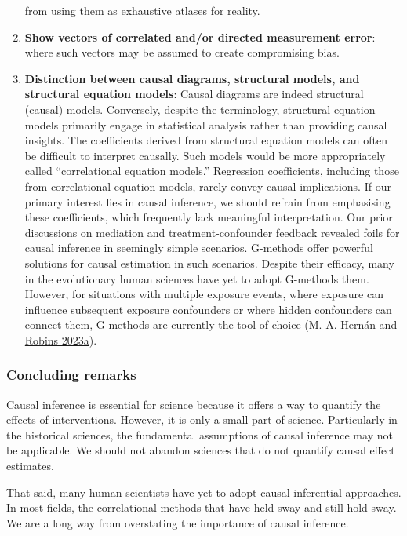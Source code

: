 \documentclass[
  singlecolumn]{article}
\begin{document}
\begin{enumerate}
  from using them as exhaustive atlases for reality.
\item
  \textbf{Show vectors of correlated and/or directed measurement error}:
  where such vectors may be assumed to create compromising bias.
\item
  \textbf{Distinction between causal diagrams, structural models, and
  structural equation models}: Causal diagrams are indeed structural
  (causal) models. Conversely, despite the terminology, structural
  equation models primarily engage in statistical analysis rather than
  providing causal insights. The coefficients derived from structural
  equation models can often be difficult to interpret causally. Such
  models would be more appropriately called ``correlational equation
  models.'' Regression coefficients, including those from correlational
  equation models, rarely convey causal implications. If our primary
  interest lies in causal inference, we should refrain from emphasising
  these coefficients, which frequently lack meaningful interpretation.
  Our prior discussions on mediation and treatment-confounder feedback
  revealed foils for causal inference in seemingly simple scenarios.
  G-methods offer powerful solutions for causal estimation in such
  scenarios. Despite their efficacy, many in the evolutionary human
  sciences have yet to adopt G-methods them. However, for situations
  with multiple exposure events, where exposure can influence subsequent
  exposure confounders or where hidden confounders can connect them,
  G-methods are currently the tool of choice
  (\protect\hyperlink{ref-hernuxe1n2023}{M. A. Hernán and Robins
  2023a}).
\end{enumerate}

\hypertarget{concluding-remarks}{%
\subsubsection{Concluding remarks}\label{concluding-remarks}}

Causal inference is essential for science because it offers a way to
quantify the effects of interventions. However, it is only a small part
of science. Particularly in the historical sciences, the fundamental
assumptions of causal inference may not be applicable. We should not
abandon sciences that do not quantify causal effect estimates.

That said, many human scientists have yet to adopt causal inferential
approaches. In most fields, the correlational methods that have held
sway and still hold sway. We are a long way from overstating the
importance of causal inference.
\end{document}
